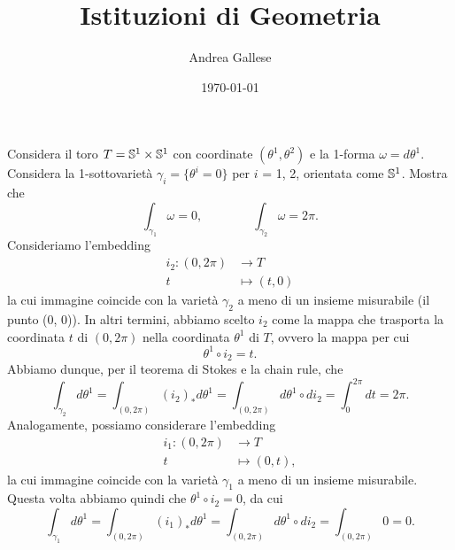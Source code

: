 \documentclass[a4paper]{article}
\title{Istituzioni di Geometria}\let\Title\@title
\author{Andrea Gallese}\let\Author\@author
\date{\today}\let\Date\@date
\begin{document}
	\Intitola
	
\begin{ex}[6.2]{Considera il toro $T = \S^1 \times \S^1 $ con coordinate $ (\theta^1, \theta^2) $ e la 1-forma $ \omega = d\theta^1 $. Considera la 1-sottovarietà $ \gamma_i  = \{\theta^i = 0 \} $ per $ i $ = 1, 2, orientata come $ \S^1 $. Mostra che \[\int_{\gamma_1} \omega =0, \qquad\qquad \int_{\gamma_2} \omega =2\pi.  \] }
	Consideriamo l'embedding
	\begin{align*}
		i_2 \colon (0, 2\pi) & \to T \\
		t &\mapsto (t, 0)
	\end{align*}
	la cui immagine coincide con la varietà $ \gamma_2 $ a meno di un insieme misurabile (il punto (0, 0)). In altri termini, abbiamo scelto $ i_2 $ come la mappa che trasporta la coordinata $ t $ di $ (0, 2\pi) $ nella coordinata $ \theta^1 $ di $ T $, ovvero la mappa per cui $$  \theta^1 \circ i_2 = t.  $$ Abbiamo dunque, per il teorema di Stokes e la chain rule, che
	\[ \int_{\gamma_2} d\theta^1 = \int_{(0, 2\pi)} (i_2)_*d\theta^1 = \int_{(0, 2\pi)} d\theta^1 \circ di_2 = \int_0^{2\pi} dt = 2\pi. \]
	Analogamente, possiamo considerare l'embedding
	\begin{align*}
	i_1 \colon (0, 2\pi) & \to T \\
	t &\mapsto (0, t),
	\end{align*}
	la cui immagine coincide con la varietà $ \gamma_1 $ a meno di un insieme misurabile. Questa volta abbiamo quindi che $ \theta^1 \circ i_2 = 0 $, da cui
	\[ \int_{\gamma_1} d\theta^1 = \int_{(0, 2\pi)} (i_1)_*d\theta^1 = \int_{(0, 2\pi)} d\theta^1 \circ di_2 = \int_{(0, 2\pi)} 0 = 0. \]
\end{ex}
\end{document}
